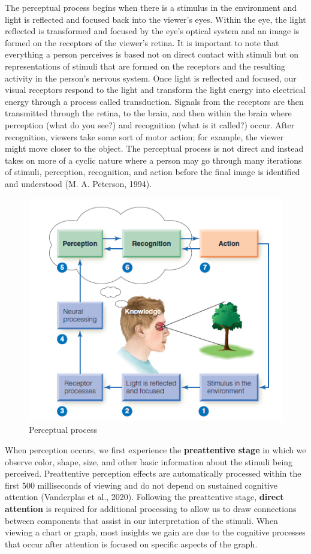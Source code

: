 \documentclass[print]{nuthesis}
\begin{document}
The perceptual process begins when there is a stimulus in the environment and light is reflected and focused back into the viewer's eyes.
Within the eye, the light reflected is transformed and focused by the eye's optical system and an image is formed on the receptors of the viewer's retina.
It is important to note that everything a person perceives is based not on direct contact with stimuli but on representations of stimuli that are formed on the receptors and the resulting activity in the person's nervous system.
Once light is reflected and focused, our visual receptors respond to the light and transform the light energy into electrical energy through a process called transduction.
Signals from the receptors are then transmitted through the retina, to the brain, and then within the brain where perception (what do you see?) and recognition (what is it called?) occur.
After recognition, viewers take some sort of motor action; for example, the viewer might move closer to the object.
The perceptual process is not direct and instead takes on more of a cyclic nature where a person may go through many iterations of stimuli, perception, recognition, and action before the final image is identified and understood (M. A. Peterson, 1994).

\begin{figure}[tbp]

{\centering \includegraphics[width=0.75\linewidth,]{images/perceptual-process-goldsein-pg5} 

}

\caption{Perceptual process}\label{fig:perceptual-process}
\end{figure}

When perception occurs, we first experience the \textbf{preattentive stage} in which we observe color, shape, size, and other basic information about the stimuli being perceived. Preattentive perception effects are automatically processed within the first 500 milliseconds of viewing and do not depend on sustained cognitive attention (Vanderplas et al., 2020).
Following the preattentive stage, \textbf{direct attention} is required for additional processing to allow us to draw connections between components that assist in our interpretation of the stimuli.
When viewing a chart or graph, most insights we gain are due to the cognitive processes that occur after attention is focused on specific aspects of the graph.
\end{document}

